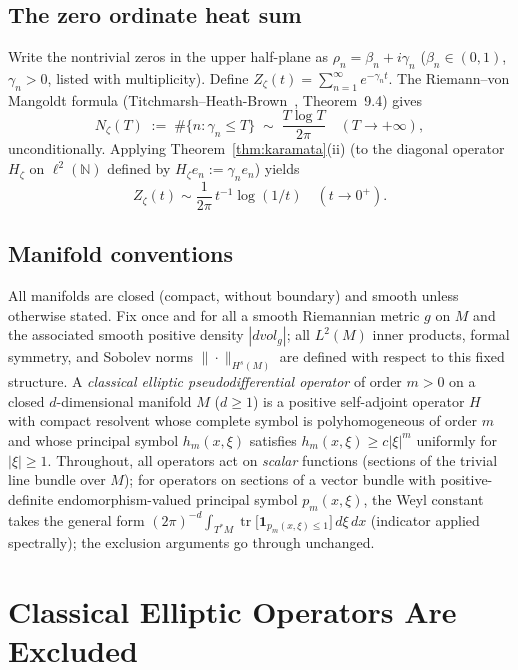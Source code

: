 \documentclass[12pt]{amsart}
\begin{document}
\subsection{The zero ordinate heat sum}

Write the nontrivial zeros in the upper half-plane as
$\rho_n=\beta_n+i\gamma_n$ ($\beta_n\in(0,1)$, $\gamma_n>0$, listed
with multiplicity).  Define $Z_\zeta(t)=\sum_{n=1}^\infty e^{-\gamma_n t}$.
The Riemann--von Mangoldt formula
(Titchmarsh--Heath-Brown~\cite{Titchmarsh1986}, Theorem~9.4) gives
\[
  N_\zeta(T)\;:=\;\#\{n:\gamma_n\le T\}
  \;\sim\;\frac{T\log T}{2\pi}
  \quad(T\to+\infty),
\]
unconditionally.  Applying Theorem~\ref{thm:karamata}(ii) (to the diagonal
operator $H_\zeta$ on $\ell^2(\mathbb{N})$ defined by $H_\zeta e_n := \gamma_n e_n$)
yields
\begin{equation}
  \label{eq:zetaheat}
  Z_\zeta(t)\sim\frac{1}{2\pi}\,t^{-1}\log(1/t)
  \quad(t\to 0^+).
\end{equation}

\subsection{Manifold conventions}

All manifolds are closed (compact, without boundary) and smooth unless
otherwise stated.  Fix once and for all a smooth Riemannian metric $g$ on
$M$ and the associated smooth positive density $|dvol_g|$; all $L^2(M)$
inner products, formal symmetry, and Sobolev norms $\|\cdot\|_{H^s(M)}$
are defined with respect to this fixed structure.
A \emph{classical elliptic pseudodifferential
operator} of order $m>0$ on a closed $d$-dimensional manifold $M$
($d\ge 1$) is a positive self-adjoint operator $H$ with compact
resolvent whose complete symbol is polyhomogeneous of order $m$ and
whose principal symbol $h_m(x,\xi)$ satisfies $h_m(x,\xi)\ge c|\xi|^m$
uniformly for $|\xi|\ge 1$.
Throughout, all operators act on \emph{scalar} functions (sections of
the trivial line bundle over $M$); for operators on sections of a
vector bundle with positive-definite endomorphism-valued principal
symbol $p_m(x,\xi)$, the Weyl constant takes the general form
$(2\pi)^{-d}\!\int_{T^*M}\operatorname{tr}\bigl[\mathbf{1}_{p_m(x,\xi)\le 1}\bigr]\,d\xi\,dx$
(indicator applied spectrally); the exclusion arguments go through unchanged.

\section{Classical Elliptic Operators Are Excluded}
\label{sec:elliptic}
\end{document}
